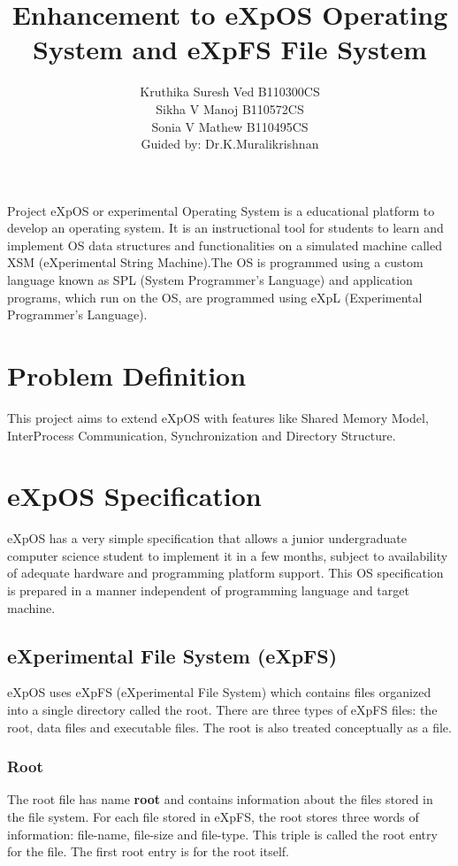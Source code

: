\documentclass[11pt ,twosided]{article}
\title{Enhancement to eXpOS Operating System and eXpFS File System}
\author{ Kruthika Suresh Ved     B110300CS\\  Sikha V Manoj     B110572CS\\  Sonia V Mathew    B110495CS\\ Guided by: Dr.K.Muralikrishnan}
\begin{document}
\maketitle
	

\abstract{} 

Project eXpOS or experimental Operating System is a educational platform to develop an operating system. It is an instructional tool for students to learn and implement OS data structures and functionalities on a simulated machine called XSM (eXperimental String Machine).The OS is programmed using a custom language known as SPL (System Programmer's Language) and application programs, which run on the OS, are programmed using eXpL (Experimental Programmer's Language).


\section{Problem Definition}

This project aims to extend eXpOS with features like Shared Memory Model, Inter\-Process Communication, Synchronization and Directory Structure.
\section{eXpOS Specification}

eXpOS has a very simple specification that allows a junior undergraduate computer science student to implement it in a few months, subject to availability of adequate hardware and programming platform support. This OS specification is prepared in a manner independent of programming language and target machine.
\subsection{eXperimental File System (eXpFS)}

eXpOS uses eXpFS (eXperimental File System) which contains files organized into a single directory called the root. There are three types of eXpFS files: the root, data files and executable files. The root is also treated conceptually as a file.
\subsubsection{Root}

The root file has name \textbf {root} and contains information about the files stored in the file system. For each file stored in eXpFS, the root stores three words of information: file-name, file-size and file-type. This triple is called the root entry for the file. The first root entry is for the root itself.  
\end{document}
